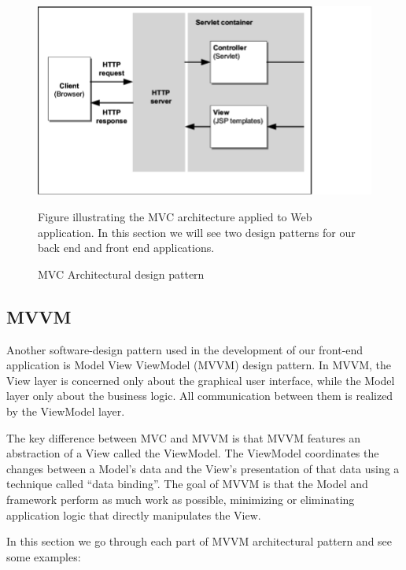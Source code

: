 \begin{figure} 
\centering
\includegraphics[width=12cm]{pictures/MVC_arch_pattern.png}
\caption{MVC Architectural design pattern}
Figure illustrating the MVC architecture applied to Web application. In this section we will see two design patterns for our back end and front end applications.
\label{fig:mvc_pic_lbl}
\end{figure}

\subsection{MVVM}
Another software-design pattern used in the development of our front-end application is Model View ViewModel (MVVM) design pattern. In MVVM, the View layer is concerned only about the graphical user interface, while the Model layer only about the business logic. All communication between them is realized by the ViewModel layer. \cite{mvvm_ref}

The key difference between MVC and MVVM is that MVVM features an abstraction of a View called the ViewModel. The ViewModel coordinates the changes between a Model’s data and the View's presentation of that data using a technique called “data binding”. The goal of MVVM is that the Model and framework perform as much work as possible, minimizing or eliminating application logic that directly manipulates the View.

In this section we go through each part of MVVM architectural pattern and see some examples:

